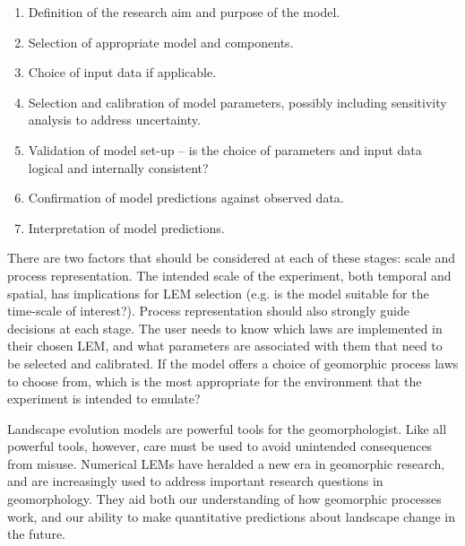 \begin{enumerate}
\item Definition of the research aim and purpose of the model.
\item Selection of appropriate model and components. 
\item Choice of input data if applicable. 
\item Selection and calibration of model parameters, possibly including sensitivity analysis to address uncertainty. 
\item Validation of model set-up – is the choice of parameters and input data logical and internally consistent?
\item Confirmation of model predictions against observed data. 
\item Interpretation of model predictions. 
\end{enumerate}

There are two factors that should be considered at each of these stages: scale and process representation. The intended scale of the experiment, both temporal and spatial, has implications for LEM selection (e.g. is the model suitable for the time-scale of interest?). Process representation should also strongly guide decisions at each stage. The user needs to know which laws are implemented in their chosen LEM, and what parameters are associated with them that need to be selected and calibrated. If the model offers a choice of geomorphic process laws to choose from, which is the most appropriate for the environment that the experiment is intended to emulate? 

Landscape evolution models are powerful tools for the geomorphologist. Like all powerful tools, however, care must be used to avoid unintended consequences from misuse. Numerical LEMs have heralded a new era in geomorphic research, and are increasingly used to address important research questions in geomorphology. They aid both our understanding of how geomorphic processes work, and our ability to make quantitative predictions about landscape change in the future.
